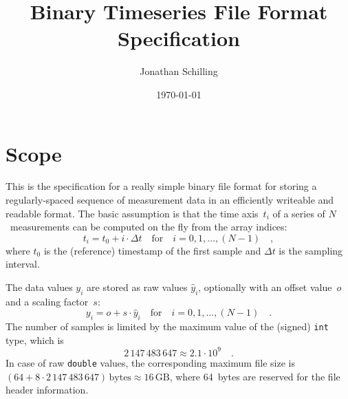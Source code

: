 \documentclass[a4paper,10pt]{article}
\title{Binary Timeseries File Format Specification}
\author{Jonathan Schilling}
\date{\today}
\begin{document}
\maketitle

\section{Scope}\label{sec:scope}

This is the specification for a really simple binary file format for storing a regularly-spaced sequence of measurement data
in an efficiently writeable and readable format.
The basic assumption is that the time axis~$t_i$ of a series of $N$~measurements can be computed on the fly from the array indices:
\begin{equation}
  t_i = t_0 + i \cdot \Delta t \quad \mathrm{for} \quad i = 0, 1, ..., (N-1) \quad ,
\end{equation}
where $t_0$ is the (reference) timestamp of the first sample and $\Delta t$ is the sampling interval.

The data values $y_i$ are stored as raw values $\hat{y}_i$, optionally with an offset value~$o$ and a scaling factor~$s$:
\begin{equation}
  y_i = o + s \cdot \hat{y}_i \quad \mathrm{for} \quad i = 0, 1, ..., (N-1) \quad .
\end{equation}
The number of samples is limited by the maximum value of the (signed) \texttt{int} type, which is
$$2\,147\,483\,647 \approx 2.1 \cdot 10^9 \quad .$$
In case of raw \texttt{double} values, the corresponding maximum file size is $(64 + 8 \cdot 2\,147\,483\,647)\,\mathrm{bytes} \approx 16\,\mathrm{GB}$,
where 64~bytes are reserved for the file header information.
\end{document}
